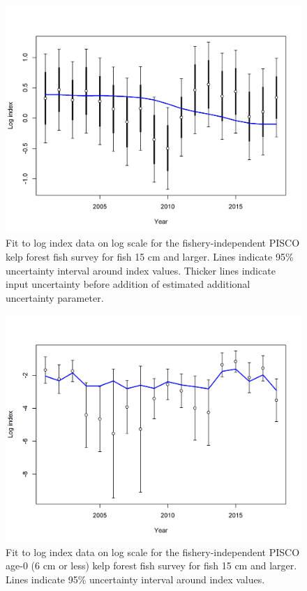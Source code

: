 \documentclass[12pt,]{article}
\begin{document}
\FloatBarrier

\begin{figure}
\centering
\includegraphics{r4ss/plots_mod1/index5_logcpuefit_PISCO.png}
\caption{Fit to log index data on log scale for the fishery-independent
PISCO kelp forest fish survey for fish 15 cm and larger. Lines indicate
95\% uncertainty interval around index values. Thicker lines indicate
input uncertainty before addition of estimated additional uncertainty
parameter. \label{fig:index5_logcpuefit_PISCO}}
\end{figure}

\FloatBarrier 

\begin{figure}
\centering
\includegraphics{r4ss/plots_mod1/index5_logcpuefit_PISCOage0.png}
\caption{Fit to log index data on log scale for the fishery-independent
PISCO age-0 (6 cm or less) kelp forest fish survey for fish 15 cm and
larger. Lines indicate 95\% uncertainty interval around index values.
\label{fig:index5_logcpuefit_PISCOage0}}
\end{figure}
\end{document}
